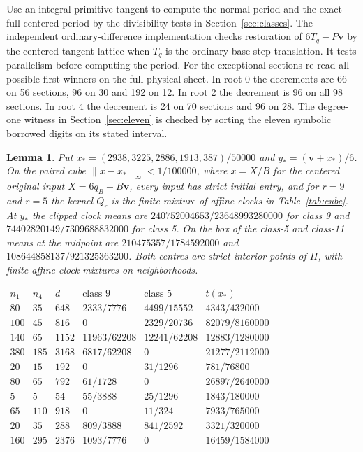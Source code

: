 \documentclass[11pt,reqno]{amsart}
\newtheorem{lemma}[theorem]{Lemma}
\theoremstyle{definition}
\newcommand{\vct}{\mathbf v}
\begin{document}
Use an integral primitive tangent to compute the normal period and
the exact full centered period by the divisibility tests in
Section~\ref{sec:classes}. The independent ordinary-difference
implementation checks restoration of \(6T_q-P\vct\) by the
centered tangent lattice when \(T_q\) is the ordinary base-step
translation. It tests parallelism before computing the period.
For the exceptional sections re-read all possible first winners
on the full physical sheet. In root 0 the decrements are 66 on 56
sections, 96 on 30 and 192 on 12. In root 2 the decrement is 96 on
all 98 sections. In root 4 the decrement is 24 on 70 sections and
96 on 28. The degree-one witness in Section~\ref{sec:eleven} is
checked by sorting the eleven symbolic borrowed digits on its
stated interval.

\begin{lemma}\label{lem:local}
Put \(x_*=(2938,3225,2886,1913,387)/50000\) and \(y_*=(\vct+x_*)/6\). On
the paired cube \(\|x-x_*\|_\infty<1/100000\), where \(x=X/B\) for the
centered original input \(X=6q_B-B\vct\), every input has strict initial
entry, and for \(r=9\) and \(r=5\) the kernel \(Q_r\) is the finite mixture
of affine clocks in Table~\ref{tab:cube}. At \(y_*\) the clipped clock
means are \(240752004653/23648993280000\) for class 9 and
\(74402820149/7309688832000\) for class 5. On the box of
\cite[Theorem~4]{G7} the class-5 and class-11 means at the midpoint are
\(210475357/1784592000\) and \(108644858137/921325363200\). Both centres
are strict interior points of \(\Pi\), with finite affine clock mixtures
on neighborhoods.
\end{lemma}

\begin{table}[htbp]
\centering
\renewcommand{\arraystretch}{1.1}
\(\begin{array}{rrr|ll|l}
 n_1&n_4&d&\text{class }9&\text{class }5&t(x_*)\\ \hline
 80&35&648&2333/7776&4499/15552&4343/432000\\
 100&45&816&0&2329/20736&82079/8160000\\
 140&65&1152&11963/62208&12241/62208&12883/1280000\\
 380&185&3168&6817/62208&0&21277/2112000\\
 20&15&192&0&31/1296&781/76800\\
 80&65&792&61/1728&0&26897/2640000\\
 5&5&54&55/3888&25/1296&1843/180000\\
 65&110&918&0&11/324&7933/765000\\
 20&35&288&809/3888&841/2592&3321/320000\\
 160&295&2376&1093/7776&0&16459/1584000
\end{array}\)
\caption{Clock profiles on the cube of Lemma~\ref{lem:local}:
\(t(x)=(n_1x_1+n_4(2x_2-2x_3+x_4))/d\), with their weights in classes 9
and 5. Each weight column sums to one. At \(x_*\),
\(x_1=1469/25000\) and \(2x_2-2x_3+x_4=2591/50000\).}\label{tab:cube}
\end{table}
\end{document}
